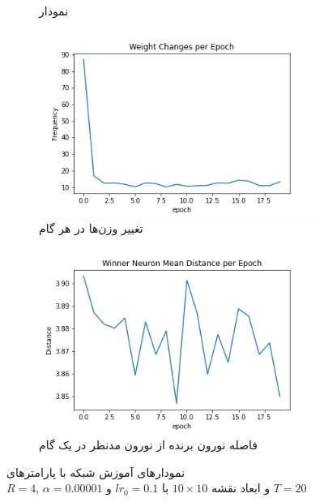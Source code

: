 \documentclass[12pt, a4paper]{article}
\begin{document}
\begin{figure}[h]
\begin{subfigure}{0.45\linewidth}
        \caption{نمودار }
    \end{subfigure}
    \newline
    \begin{subfigure}{0.45\linewidth}
        \includegraphics[width=\linewidth]{images/q5/r10/weight_change.png}
        \caption{تغییر وزن‌ها در هر گام}
    \end{subfigure}
    \hfill
    \begin{subfigure}{0.45\linewidth}
        \includegraphics[width=\linewidth]{images/q5/r10/winner_distance.png}
        \caption{فاصله نورون برنده از نورون مدنظر در یک گام}
    \end{subfigure}
    \caption{نمودار‌های آموزش شبکه  با پارامتر‌های \\$R=4$, $\alpha=0.00001$ و ابعاد نقشه $10 \times 10$ با $lr_0=0.1$ و $T=20$}
    \label{r10}
\end{figure}
\end{document}

